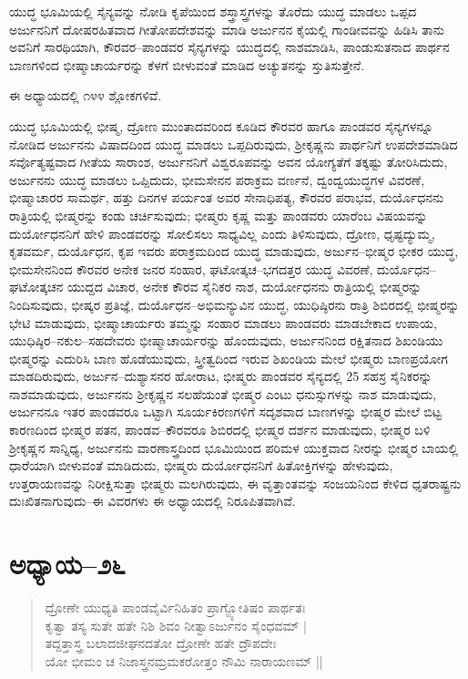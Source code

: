 ಯುದ್ಧ ಭೂಮಿಯಲ್ಲಿ ಸೈನ್ಯವನ್ನು ನೋಡಿ ಕೃಪೆಯಿಂದ ಶಸ್ತ್ರಾಸ್ತ್ರಗಳನ್ನು ತೊರೆದು ಯುದ್ಧ ಮಾಡಲು ಒಪ್ಪದ ಅರ್ಜುನನಿಗೆ ದೋಷರಹಿತವಾದ ಗೀತೋಪದೇಶವನ್ನು ಮಾಡಿ ಅರ್ಜುನನ ಕೈಯಲ್ಲಿ ಗಾಂಡೀವವನ್ನು ಹಿಡಿಸಿ ತಾನು ಅವನಿಗೆ ಸಾರಥಿಯಾಗಿ, ಕೌರವರ–ಪಾಂಡವರ ಸೈನ್ಯಗಳನ್ನು ಯುದ್ಧದಲ್ಲಿ ನಾಶಮಾಡಿಸಿ, ಪಾಂಡುಸುತನಾದ ಪಾರ್ಥನ ಬಾಣಗಳಿಂದ ಭೀಷ್ಮಾಚಾರ್ಯರನ್ನು ಕೆಳಗೆ ಬೀಳುವಂತೆ ಮಾಡಿದ ಅಚ್ಯುತನನ್ನು ಸ್ತುತಿಸುತ್ತೇನೆ.

ಈ ಅಧ್ಯಾಯದಲ್ಲಿ ೧೪೪ ಶ್ಲೋಕಗಳಿವೆ.

ಯುದ್ಧ ಭೂಮಿಯಲ್ಲಿ ಭೀಷ್ಮ, ದ್ರೋಣ ಮುಂತಾದವರಿಂದ ಕೂಡಿದ ಕೌರವರ ಹಾಗೂ ಪಾಂಡವರ ಸೈನ್ಯಗಳನ್ನೂ ನೋಡಿದ ಅರ್ಜುನನು ವಿಷಾದದಿಂದ ಯುದ್ಧ ಮಾಡಲು ಒಪ್ಪದಿರುವುದು, ಶ‍್ರೀಕೃಷ್ಣನು ಪಾರ್ಥನಿಗೆ ಉಪದೇಶಮಾಡಿದ ಸರ್ವೊತ್ಯಷ್ಟವಾದ ಗೀತೆಯ ಸಾರಾಂಶ, ಅರ್ಜುನನಿಗೆ ವಿಶ್ವರೂಪವನ್ನು ಅವನ ಯೋಗ್ಯತೆಗೆ ತಕ್ಕಷ್ಟು ತೋರಿಸಿದುದು, ಅರ್ಜುನನು ಯುದ್ಧ ಮಾಡಲು ಒಪ್ಪಿದುದು, ಭೀಮಸೇನನ ಪರಾಕ್ರಮ ವರ್ಣನೆ, ದ್ವಂದ್ವಯುದ್ಧಗಳ ವಿವರಣೆ, ಭೀಷ್ಮಾಚಾರರ ಸಾಮರ್ಥ, ಹತ್ತು ದಿನಗಳ ಪರ್ಯಂತ ಅವರ ಸೇನಾಧಿಪತ್ಯ, ಕೌರವರ ಪರಾಭವ, ದುರ್ಯೊಧನನು ರಾತ್ರಿಯಲ್ಲಿ ಭೀಷ್ಮರನ್ನು ಕಂಡು ಚರ್ಚಿಸುವುದು; ಭೀಷ್ಮರು ಕೃಷ್ಣ ಮತ್ತು ಪಾಂಡವರು ಯಾರೆಂಬ ವಿಷಯವನ್ನು ದುರ್ಯೋಧನನಿಗೆ ಹೇಳಿ ಪಾಂಡವರನ್ನು ಸೋಲಿಸಲು ಸಾಧ್ಯವಿಲ್ಲ ಎಂದು ತಿಳಿಸುವುದು, ದ್ರೋಣ, ಧೃಷ್ಟದ್ಯುಮ್ಮ, ಕೃತವರ್ಮ, ದುರ್ಯೊಧನ, ಕೃಪ ಇವರು ಪರಾಕ್ರಮದಿಂದ ಯುದ್ಧ ಮಾಡುವುದು, ಅರ್ಜುನ–ಭೀಷ್ಮರ ಭೀಕರ ಯುದ್ಧ, ಭೀಮಸೇನನಿಂದ ಕೌರವರ ಅನೇಕ ಜನರ ಸಂಹಾರ, ಘಟೋತ್ಕಚ–ಭಗದತ್ತರ ಯುದ್ಧ ವಿವರಣೆ, ದುರ್ಯೊಧನ–ಘಟೋತ್ಕಚನ ಯುದ್ದದ ವಿಚಾರ, ಅನೇಕ ಕೌರವ ಸೈನಿಕರ ನಾಶ, ದುರ್ಯೋಧನನು ರಾತ್ರಿಯಲ್ಲಿ ಭೀಷ್ಮರನ್ನು ನಿಂದಿಸುವುದು, ಭೀಷ್ಕರ ಪ್ರತಿಜ್ಞೆ, ದುರ್ಯೊಧನ–ಅಭಿಮನ್ಯುವಿನ ಯುದ್ಧ, ಯುಧಿಷ್ಠಿರನು ರಾತ್ರಿ ಶಿಬಿರದಲ್ಲಿ ಭೀಷ್ಮರನ್ನು ಭೇಟಿ ಮಾಡುವುದು, ಭೀಷ್ಮಾಚಾರ್ಯರು ತಮ್ಮನ್ನು ಸಂಹಾರ ಮಾಡಲು ಪಾಂಡವರು ಮಾಡಬೇಕಾದ ಉಪಾಯ, ಯುಧಿಷ್ಠಿರ–ನಕುಲ–ಸಹದೇವರು ಭೀಷ್ಮಾಚಾರ್ಯರನ್ನು ಹೊಂದುವುದು, ಅರ್ಜುನನಿಂದ ರಕ್ಷಿತನಾದ ಶಿಖಂಡಿಯು ಭೀಷ್ಮರನ್ನು ಎದುರಿಸಿ ಬಾಣ ಹೊಡೆಯುವುದು, ಸ್ತ್ರೀತ್ವದಿಂದ ಇರುವ ಶಿಖಂಡಿಯ ಮೇಲೆ ಭೀಷ್ಮರು ಬಾಣಪ್ರಯೋಗ ಮಾಡದಿರುವುದು, ಅರ್ಜುನ–ದುಶ್ಯಾಸನರ ಹೋರಾಟ, ಭೀಷ್ಮರು ಪಾಂಡವರ ಸೈನ್ಯದಲ್ಲಿ 25 ಸಹಸ್ರ ಸೈನಿಕರನ್ನು ನಾಶಮಾಡುವುದು, ಅರ್ಜುನನು ಶ‍್ರೀಕೃಷ್ಣನ ಸಲಹೆಯಂತೆ ಭೀಷ್ಮರ ಎಂಟು ಧನುಸ್ಸುಗಳನ್ನು ನಾಶ ಮಾಡುವುದು, ಅರ್ಜುನನೂ ಇತರ ಪಾಂಡವರೂ ಒಟ್ಟಾಗಿ ಸೂರ್ಯಕಿರಣಗಳಿಗೆ ಸದೃಶವಾದ ಬಾಣಗಳನ್ನು ಭೀಷ್ಮರ ಮೇಲೆ ಬಿಟ್ಟ ಕಾರಣದಿಂದ ಭೀಷ್ಮರ ಪತನ, ಪಾಂಡವ–ಕೌರವರೂ ಶಿಬಿರದಲ್ಲಿ ಭೀಷ್ಮರ ದರ್ಶನ ಮಾಡುವುದು, ಭೀಷ್ಮರ ಬಳಿ ಶ‍್ರೀಕೃಷ್ಣನ ಸಾನ್ನಿಧ್ಯ, ಅರ್ಜುನನು ವಾರಣಾಸ್ತ್ರದಿಂದ ಭೂಮಿಯಿಂದ ಪರಿಮಳ ಯುಕ್ತವಾದ ನೀರನ್ನು ಭೀಷ್ಮರ ಬಾಯಲ್ಲಿ ಧಾರೆಯಾಗಿ ಬೀಳುವಂತೆ ಮಾಡಿದುದು, ಭೀಷ್ಮರು ದುರ್ಯೋಧನನಿಗೆ ಹಿತೋಕ್ತಿಗಳನ್ನು ಹೇಳುವುದು, ಉತ್ತರಾಯಣವನ್ನು ನಿರೀಕ್ಷಿಸುತ್ತಾ ಭೀಷ್ಮರು ಮಲಗಿರುವುದು, ಈ ವೃತ್ತಾಂತವನ್ನು ಸಂಜಯನಿಂದ ಕೇಳಿದ ಧೃತರಾಷ್ಟ್ರನು ದುಃಖಿತನಾಗುವುದು–ಈ ವಿವರಗಳು ಈ ಅಧ್ಯಾಯದಲ್ಲಿ ನಿರೂಪಿತವಾಗಿವೆ.


\section{ಅಧ್ಯಾಯ–೨೬}

\begin{verse}
ದ್ರೋಣೇ ಯುಧ್ಯತಿ ಪಾಂಡವೈರ್ವಿನಿಹಿತಂ ಪ್ರಾಗ್ಜ್ಯೋತಿಷಂ ಪಾರ್ಥತಃ\\ ಕೃತ್ವಾ ತಸ್ಯ ಸುತೇ ಹತೇ ನಿಶಿ ಶಿವಂ ನೀತ್ವಾಽರ್ಜುನಂ ಸೈಂಧವಮ್ |\\ ತದ್ದತ್ತಾಸ್ತ್ರ ಬಲಾದಜೀಘನದತೋ ದ್ರೋಣೇ ಹತೇ ದ್ರೌಪದೇಃ\\ ಯೋ ಭೀಮಂ ಚ ನಿಜಾಸ್ತ್ರನಮ್ರಮಕರೋತ್ತಂ ನೌಮಿ ನಾರಾಯಣಮ್ ||
\end{verse}

